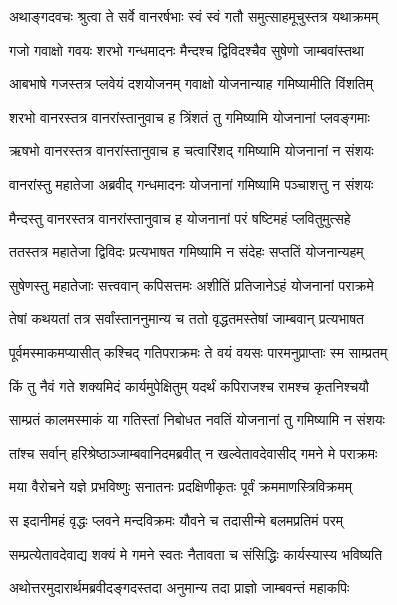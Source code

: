 
\twolineshloka
{अथाङ्गदवचः श्रुत्वा ते सर्वे वानरर्षभाः}
{स्वं स्वं गतौ समुत्साहमूचुस्तत्र यथाक्रमम्} %

\twolineshloka
{गजो गवाक्षो गवयः शरभो गन्धमादनः}
{मैन्दश्च द्विविदश्चैव सुषेणो जाम्बवांस्तथा} %

\twolineshloka
{आबभाषे गजस्तत्र प्लवेयं दशयोजनम्}
{गवाक्षो योजनान्याह गमिष्यामीति विंशतिम्} %

\twolineshloka
{शरभो वानरस्तत्र वानरांस्तानुवाच ह}
{त्रिंशतं तु गमिष्यामि योजनानां प्लवङ्गमाः} %

\twolineshloka
{ऋषभो वानरस्तत्र वानरांस्तानुवाच ह}
{चत्वारिंशद् गमिष्यामि योजनानां न संशयः} %

\twolineshloka
{वानरांस्तु महातेजा अब्रवीद् गन्धमादनः}
{योजनानां गमिष्यामि पञ्चाशत्तु न संशयः} %

\twolineshloka
{मैन्दस्तु वानरस्तत्र वानरांस्तानुवाच ह}
{योजनानां परं षष्टिमहं प्लवितुमुत्सहे} %

\twolineshloka
{ततस्तत्र महातेजा द्विविदः प्रत्यभाषत}
{गमिष्यामि न संदेहः सप्ततिं योजनान्यहम्} %

\twolineshloka
{सुषेणस्तु महातेजाः सत्त्ववान् कपिसत्तमः}
{अशीतिं प्रतिजानेऽहं योजनानां पराक्रमे} %

\twolineshloka
{तेषां कथयतां तत्र सर्वांस्ताननुमान्य च}
{ततो वृद्धतमस्तेषां जाम्बवान् प्रत्यभाषत} %

\twolineshloka
{पूर्वमस्माकमप्यासीत् कश्चिद् गतिपराक्रमः}
{ते वयं वयसः पारमनुप्राप्ताः स्म साम्प्रतम्} %

\twolineshloka
{किं तु नैवं गते शक्यमिदं कार्यमुपेक्षितुम्}
{यदर्थं कपिराजश्च रामश्च कृतनिश्चयौ} %

\twolineshloka
{साम्प्रतं कालमस्माकं या गतिस्तां निबोधत}
{नवतिं योजनानां तु गमिष्यामि न संशयः} %

\twolineshloka
{तांश्च सर्वान् हरिश्रेष्ठाञ्जाम्बवानिदमब्रवीत्}
{न खल्वेतावदेवासीद् गमने मे पराक्रमः} %

\twolineshloka
{मया वैरोचने यज्ञे प्रभविष्णुः सनातनः}
{प्रदक्षिणीकृतः पूर्वं क्रममाणस्त्रिविक्रमम्} %

\twolineshloka
{स इदानीमहं वृद्धः प्लवने मन्दविक्रमः}
{यौवने च तदासीन्मे बलमप्रतिमं परम्} %

\twolineshloka
{सम्प्रत्येतावदेवाद्य शक्यं मे गमने स्वतः}
{नैतावता च संसिद्धिः कार्यस्यास्य भविष्यति} %

\twolineshloka
{अथोत्तरमुदारार्थमब्रवीदङ्गदस्तदा}
{अनुमान्य तदा प्राज्ञो जाम्बवन्तं महाकपिः} %

